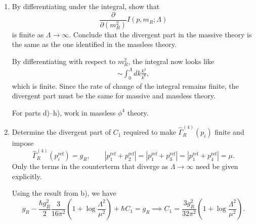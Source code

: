\begin{enumerate}[label=\alph*)]
    \item By differentiating under the integral, show that
    \begin{equation}
        \frac{\partial}{\partial(m_R^2)}I(p,m_R;\Lambda)
    \end{equation}
    is finite as $\Lambda\to\infty$. Conclude that the divergent part in the
    massive theory is the same as the one identified in the massless theory.
    \begin{solution}
        By differentiating with respect to $m_R^2$, the integral now looks like
        \begin{equation}
            \begin{aligned}
                \sim\int^\Lambda_0 dk \frac{k^3}{k^6},
            \end{aligned}
        \end{equation}
        which is finite. Since the rate of change of the integral remains finite, the divergent part must be the same for massive and massless theory.
    \end{solution}

    For parts d)--h), work in massless $\phi^4$ theory.

    \item Determine the divergent part of $C_1$ required to make
    $\widehat\Gamma_R^{(4)}(p_i)$ finite and impose
    \begin{equation}
        \widehat\Gamma_R^{(4)}(p_i^{\mathrm{ref}})=g_R,
        \qquad
        |p_1^{\mathrm{ref}}+p_2^{\mathrm{ref}}|
        =|p_1^{\mathrm{ref}}+p_3^{\mathrm{ref}}|
        =|p_1^{\mathrm{ref}}+p_4^{\mathrm{ref}}|
        =\mu.
    \end{equation}
    Only the terms in the counterterm that diverge as $\Lambda\to\infty$ need
    be given explicitly.
    \begin{solution}
        Using the result from b), we have
        \begin{equation}
            g_R - \frac{\hbar g_R^2}{2}\frac{3}{16\pi^2}\left(1 + \log{\frac{\Lambda^2}{\mu^2}}\right) + \hbar C_1 = g_R \implies C_1 = \frac{3g_R^2}{32\pi^2}\left(1 + \log{\frac{\Lambda^2}{\mu^2}}\right).
        \end{equation}
    \end{solution}


\end{enumerate}
